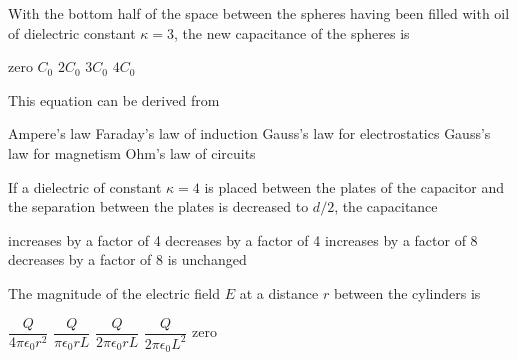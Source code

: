 \documentclass{../../oss-apphys-exam}
\begin{document}
\begin{multicols*}{2}
\begin{questions}
    \question With the bottom half of the space between the spheres having been
    filled with oil of dielectric constant $\kappa=3$, the new capacitance of
    the spheres is
    \label{cap2}
    \begin{choices}
      \choice zero
      \choice $C_0$
      \choice $2C_0$
      \choice $3C_0$
      \choice $4C_0$
    \end{choices}


    \question This equation can be derived from
    \begin{choices}
      \choice Ampere's law
      \choice Faraday's law of induction
      \choice Gauss's law for electrostatics
      \choice Gauss's law for magnetism
      \choice Ohm's law of circuits
    \end{choices}
    \label{plate1}
    
    \question If a dielectric of constant $\kappa=4$ is placed between the
    plates of the capacitor and the separation between the plates is decreased
    to $d/2$, the capacitance
    \begin{choices}
      \choice increases by a factor of 4
      \choice decreases by a factor of 4
      \choice increases by a factor of 8
      \choice decreases by a factor of 8
      \choice is unchanged
    \end{choices}
    \label{plate2}
    \columnbreak
    

    \question The magnitude of the electric field $E$ at a distance $r$ between
    the cylinders is
    \begin{choices}
      \choice $\dfrac Q{4\pi\epsilon_0r^2}$
      \choice $\dfrac Q{\pi\epsilon_0rL}$
      \choice $\dfrac Q{2\pi\epsilon_0rL}$
      \choice $\dfrac Q{2\pi\epsilon_0L^2}$
      \choice zero
    \end{choices}
    \label{cyl1}


\end{questions}
\end{multicols*}
\end{document}
